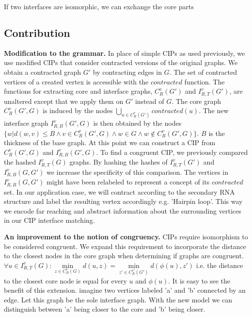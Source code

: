 \documentclass{article}
\begin{document}
If two interfaces are isomorphic, we can exchange the core parts


\subsection{Contribution}
\textbf{Modification to the grammar.}
In place of simple CIPs as used previously,
we use modified CIPs that consider contracted versions
of the original graphs. We obtain a contracted graph $G'$ by contracting edges
in $G$. The set of contracted vertices of a
created vertex is accessible with the $contracted$ function.
The functions for extracting core and interface graphs, 
$C_{R}^v(G')$ and $I_{R,T}^v(G')$, are unaltered except that we apply them
on $G'$ instead of $G$. 
The core graph $C_{R}^v(G',G)$ is induced by the nodes 
$\bigcup\limits_{u \in C_R^v(G')} contracted(u)$.
The new interface graph $I_{R,B}^v(G',G)$ is then obtained by the nodes 
$\{ w | d(w,v) \leq B \wedge v\in C_R^v(G',G) \wedge w \in G \wedge w 
\notin C_R^v(G',G) \}$.  $B$ is the thickness of the base graph. 
At this point we can construct a CIP from $C_R^v(G',G)$ and $I_{R,B}^v(G',G)$. 
To find a congruent CIP, we previously compared the hashed $I_{R,T}^v(G)$ 
graphs. By hashing the hashes of $I_{R,T}^v(G')$ and $I_{R,B}^v(G,G')$ we 
increase the specificity of this comparison. The vertices in $I_{R,B}^v(G,G')$ 
might have been relabeled to represent a concept of its $contracted$ set. In 
our application case, we will contract according to the 
secondary RNA structure and label the resulting vertex accordingly e.g.
'Hairpin loop'. This way we encode far reaching and abstract 
information about the surrounding vertices in our CIP interface matching.


\textbf{An improvement to the notion of congruency.}
CIPs require isomorphism to be considered congruent.
We expand this requirement to incorporate
the distance to the closest nodes in the core graph when 
determining if graphs are congruent.
$\forall u \in I_{R,T}^v(G) : 
\underset{z \in  C_{R}^v(G)}{\min} d(u,z) = 
\underset{z' \in  C_{R}^{v'}(G')}{\min} d(\phi(u),z') $ i.e. the distance 
to the closest core node is equal for every
$u$ and $\phi(u)$.
It is easy to see the benefit of this extension.
imagine two vertices labeled 'a' and 'b' connected by an edge. Let this graph
be the sole interface graph. With the new model we can distinguish 
between 'a' being closer to the core and 'b' being closer. 
\end{document}
